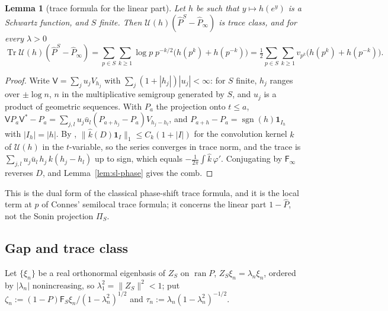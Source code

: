 \documentclass[11pt]{amsart}
\newtheorem{lemma}[theorem]{Lemma}
\theoremstyle{definition}
\theoremstyle{remark}
\begin{document}
\begin{lemma}[trace formula for the linear part]\label{lem:sl-linear}
Let $h$ be such that $y\mapsto h(e^y)$ is a Schwartz function, and $S$ finite. Then $\mathcal U(h)(\widehat P^S-\widehat P_\infty)$
is trace class, and for every $\lambda>0$
\[
\operatorname{Tr}\mathcal U(h)(\widehat P^S-\widehat P_\infty)=\sum_{p\in S}\sum_{k\ge1}\log p\;p^{-k/2}\big(h(p^k)+h(p^{-k})\big)
=\tfrac12\sum_{p\in S}\sum_{k\ge1}v_{p^k}\big(h(p^k)+h(p^{-k})\big).
\]
\end{lemma}
\begin{proof}
Write $\mathsf V=\sum_ju_jV_{h_j}$ with $\sum_j(1+|h_j|)|u_j|<\infty$: for $S$ finite, $h_j$ ranges over $\pm\log n$, $n$ in the
multiplicative semigroup generated by $S$, and $u_j$ is a product of geometric sequences. With $P_a$ the projection
onto $t\le a$, $\mathsf VP_a\mathsf V^*-P_a=\sum_{j,l}u_j\bar u_l(P_{a+h_j}-P_a)V_{h_j-h_l}$, and $P_{a+h}-P_a=\operatorname{sgn}(h)\mathbf 1_{I_h}$ with
$|I_h|=|h|$. By \cite[Thm.~4.5]{Simon2005}, $\|\widehat k(D)\mathbf 1_I\|_1\le C_k(1+|I|)$ for the convolution kernel $k$ of
$\mathcal U(h)$ in the $t$-variable, so the series converges in trace norm, and the trace is
$\sum_{j,l}u_j\bar u_l\,h_j\,k(h_j-h_l)$ up to sign, which equals $-\frac1{2\pi}\int\widehat k\,\varphi'$. Conjugating by
$\mathsf F_\infty$ reverses $D$, and Lemma~\ref{lem:sl-phase} gives the comb.
\end{proof}
This is the dual form of the classical phase-shift trace formula, and it is the local term at $p$ of Connes'
semilocal trace formula; it concerns the linear part $1-\widehat P$, not the Sonin projection $\Pi_S$.

\subsection{Gap and trace class}\label{subsec:sl-trace}
Let $\{\xi_n\}$ be a real orthonormal eigenbasis of $Z_S$ on $\operatorname{ran}P$, $Z_S\xi_n=\lambda_n\xi_n$, ordered by $|\lambda_n|$
nonincreasing, so $\lambda_1^2=\|Z_S\|^2<1$; put $\zeta_n:=(1-P)\mathsf F_S\xi_n/(1-\lambda_n^2)^{1/2}$ and
$\tau_n:=\lambda_n(1-\lambda_n^2)^{-1/2}$.
\end{document}
